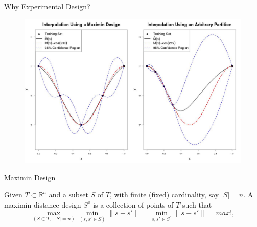 \documentclass[11pt]{beamer}
\theoremstyle{plain}
\theoremstyle{definition}
\begin{document}
\begin{frame}{Why Experimental Design?}
\begin{figure}
\includegraphics[scale=0.2]{../FigChap2/partitionComparison.jpg}
\end{figure}

\end{frame}

\begin{frame}{Maximin Design}

Given $T\subset\mathbb{R}^{n}$ and a subset $S$ of $T$, 
with finite (fixed) cardinality, say $|S|=n$.
A maximin distance design $S^{o}$ is a collection of points of $T$  such that
\begin{equation*}
\max_{(S\subset T,\text{ }|S|=n)}\min_{(s,s'\in S)}\|s-s'\|=\min_{s,s'\in S^{o}}\|s-s'\|=max!,
\end{equation*}
\end{frame}
\end{document}
